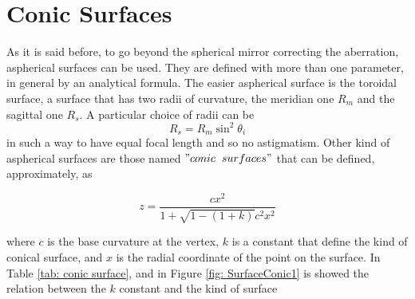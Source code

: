 \section{Conic Surfaces}
As it is said before, to go beyond the spherical mirror correcting the aberration, aspherical surfaces can be used. They are defined with more than one parameter, in general by an analytical formula. The easier aspherical surface is the toroidal surface, a surface that has two radii of curvature, the meridian one $R_m $ and the sagittal one $R_s $. A particular choice of radii can be
\begin{equation}
R_s = R_m \sin^2 \theta_i
\end{equation}
\noindent in such a way to have equal focal length and so no astigmatism. Other kind of aspherical surfaces are those named $"conic \hspace{2mm} surfaces"$ that can be defined, approximately, as

\begin{equation}
	z = \frac{c x^2}{1 + \sqrt{1 - (1 + k)} c^2 x^2}
\end{equation}

\noindent where $c $ is the base curvature at the vertex, $k $ is a constant that define the kind of conical surface, and $x $ is the radial coordinate of the point on the surface. In Table \ref{tab: conic surface}, and in Figure \ref{fig: SurfaceConic1} is showed the relation between the $k $ constant and the kind of surface

